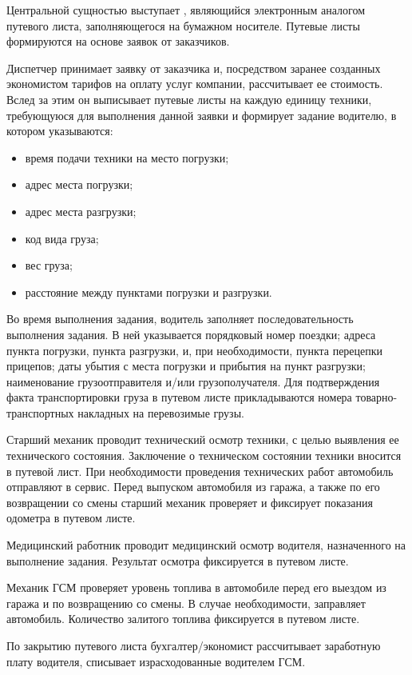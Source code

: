 \documentclass[../nirs.tex]{subfiles}
\begin{document}
\pagebreak

Центральной сущностью выступает , являющийся
электронным аналогом путевого листа, заполняющегося на бумажном носителе.
Путевые листы формируются на основе заявок от заказчиков.

Диспетчер принимает заявку от заказчика и, посредством заранее созданных
экономистом тарифов на оплату услуг компании, рассчитывает ее стоимость. Вслед
за этим он выписывает путевые листы на каждую единицу техники, требующуюся для
выполнения данной заявки и формирует задание водителю, в котором указываются:
\begin{itemize}
	\item время подачи техники на место погрузки;
	\item адрес места погрузки;
	\item адрес места разгрузки;
	\item код вида груза;
	\item вес груза;
	\item расстояние между пунктами погрузки и разгрузки.
\end{itemize}

Во время выполнения задания, водитель заполняет последовательность выполнения
задания. В ней указывается порядковый номер поездки; адреса пункта погрузки,
пункта разгрузки, и, при необходимости, пункта перецепки прицепов; даты убытия с
места погрузки и прибытия на пункт разгрузки; наименование грузоотправителя
и/или грузополучателя. Для подтверждения факта транспортировки груза в путевом
листе прикладываются номера товарно-транспортных накладных на перевозимые грузы.

Старший механик проводит технический осмотр техники, с целью выявления ее
технического состояния. Заключение о техническом состоянии техники
вносится в путевой лист. При необходимости проведения технических работ
автомобиль отправляют в сервис. Перед выпуском автомобиля из гаража, а также по
его возвращении со смены старший механик проверяет и фиксирует показания
одометра в путевом листе.

Медицинский работник проводит медицинский осмотр водителя, назначенного на
выполнение задания. Результат осмотра фиксируется в путевом листе.

Механик ГСМ проверяет уровень топлива в автомобиле перед его выездом из гаража и
по возвращению со смены. В случае необходимости, заправляет автомобиль.
Количество залитого топлива фиксируется в путевом листе.

По закрытию путевого листа бухгалтер/экономист рассчитывает заработную плату
водителя, списывает израсходованные водителем ГСМ.
\end{document}
